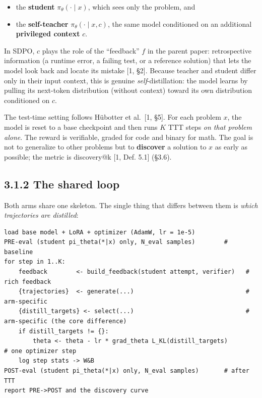 \begin{itemize}
\tightlist
\item
  the \textbf{student} \(\pi_\theta(\cdot \mid x)\), which sees only the problem, and
\item
  the \textbf{self-teacher} \(\pi_\theta(\cdot \mid x, c)\), the same model conditioned on an additional \textbf{privileged context} \(c\).
\end{itemize}

In SDPO, \(c\) plays the role of the ``feedback'' \(f\) in the parent paper: retrospective information (a runtime error, a failing test, or a reference solution) that lets the model look back and locate its mistake {[}1, §2{]}. Because teacher and student differ only in their input context, this is genuine \emph{self}-distillation: the model learns by pulling its next-token distribution (without context) toward its own distribution conditioned on \(c\).

The test-time setting follows Hübotter et al.~{[}1, §5{]}. For each problem \(x\), the model is reset to a base checkpoint and then runs \(K\) TTT steps \emph{on that problem alone}. The reward is verifiable, graded for code and binary for math. The goal is not to generalize to other problems but to \textbf{discover} a solution to \(x\) as early as possible; the metric is discovery@k {[}1, Def. 5.1{]} (§3.6).

\subsection{3.1.2 The shared loop}\label{the-shared-loop}

Both arms share one skeleton. The single thing that differs between them is \emph{which trajectories are distilled}:

\begin{lstlisting}
load base model + LoRA + optimizer (AdamW, lr = 1e-5)
PRE-eval (student pi_theta(*|x) only, N_eval samples)        # baseline
for step in 1..K:
    feedback        <- build_feedback(student attempt, verifier)   # rich feedback
    {trajectories}  <- generate(...)                               # arm-specific
    {distill_targets} <- select(...)                               # arm-specific (the core difference)
    if distill_targets != {}:
        theta <- theta - lr * grad_theta L_KL(distill_targets)                    # one optimizer step
    log step stats -> W&B
POST-eval (student pi_theta(*|x) only, N_eval samples)       # after TTT
report PRE->POST and the discovery curve
\end{lstlisting}

